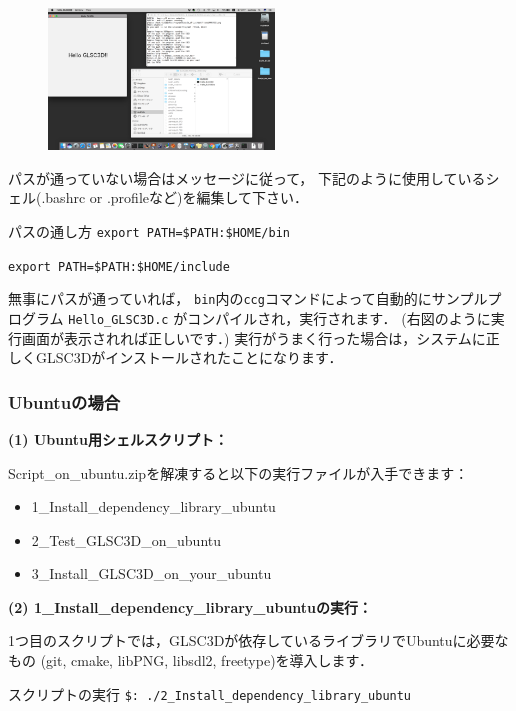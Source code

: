 \documentclass[platex,a4paper,12pt]{jsarticle}%
\begin{document}
\begin{figure}
\includegraphics[width=60mm]{Canvas_Hello_GLSD3D.eps}
\vspace{-4\baselineskip}
\end{figure}

パスが通っていない場合はメッセージに従って，
下記のように使用しているシェル(.bashrc or .profileなど)を編集して下さい．

\begin{itembox}[l]{パスの通し方}
\verb|export PATH=$PATH:$HOME/bin|
	
\verb|export PATH=$PATH:$HOME/include|
\end{itembox}

無事にパスが通っていれば，
\verb|bin|内の\verb|ccg|コマンドによって自動的にサンプルプログラム \verb|Hello_GLSC3D.c| がコンパイルされ，実行されます．
(右図のように実行画面が表示されれば正しいです．)
実行がうまく行った場合は，システムに正しくGLSC3Dがインストールされたことになります．

\subsubsection{Ubuntuの場合}

\noindent 
{\bf (1) Ubuntu用シェルスクリプト：} 

Script\_on\_ubuntu.zipを解凍すると以下の実行ファイルが入手できます：
\begin{itemize}
\item[] 1\_Install\_dependency\_library\_ubuntu
\item[] 2\_Test\_GLSC3D\_on\_ubuntu
\item[] 3\_Install\_GLSC3D\_on\_your\_ubuntu
\end{itemize}

\noindent 
{\bf (2) 1\_Install\_dependency\_library\_ubuntuの実行：} 

1つ目のスクリプトでは，GLSC3Dが依存しているライブラリでUbuntuに必要なもの
(git, cmake, libPNG, libsdl2, freetype)を導入します．

\begin{itembox}[l]{スクリプトの実行}
\verb|$: ./2_Install_dependency_library_ubuntu|
\end{itembox}
\end{document}

